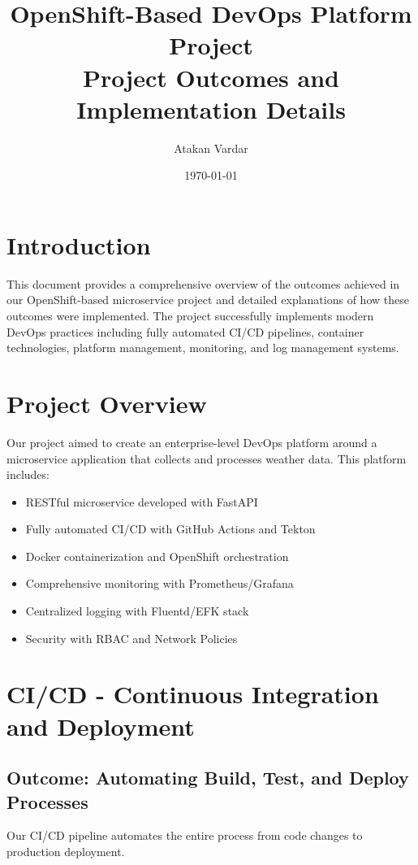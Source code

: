 \documentclass[12pt,a4paper]{article}
\title{\textbf{OpenShift-Based DevOps Platform Project}\\
\Large Project Outcomes and Implementation Details}
\author{Atakan Vardar}
\date{\today}
\begin{document}
\maketitle
\tableofcontents
\newpage

\section{Introduction}

This document provides a comprehensive overview of the outcomes achieved in our OpenShift-based microservice project and detailed explanations of how these outcomes were implemented. The project successfully implements modern DevOps practices including fully automated CI/CD pipelines, container technologies, platform management, monitoring, and log management systems.

\section{Project Overview}

Our project aimed to create an enterprise-level DevOps platform around a microservice application that collects and processes weather data. This platform includes:

\begin{itemize}
    \item RESTful microservice developed with FastAPI
    \item Fully automated CI/CD with GitHub Actions and Tekton
    \item Docker containerization and OpenShift orchestration
    \item Comprehensive monitoring with Prometheus/Grafana
    \item Centralized logging with Fluentd/EFK stack
    \item Security with RBAC and Network Policies
\end{itemize}

\section{CI/CD - Continuous Integration and Deployment}

\subsection{Outcome: Automating Build, Test, and Deploy Processes}

Our CI/CD pipeline automates the entire process from code changes to production deployment.
\end{document}
